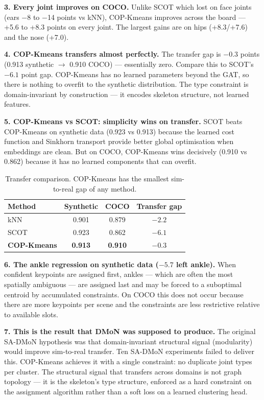 \textbf{3. Every joint improves on COCO.} Unlike SCOT which lost on face joints (ears $-$8 to $-$14 points vs kNN), COP-Kmeans improves across the board --- +5.6 to +8.3 points on every joint. The largest gains are on hips (+8.3/+7.6) and the nose (+7.0).

\textbf{4. COP-Kmeans transfers almost perfectly.} The transfer gap is $-0.3$ points (0.913 synthetic $\to$ 0.910 COCO) --- essentially zero. Compare this to SCOT's $-6.1$ point gap. COP-Kmeans has no learned parameters beyond the GAT, so there is nothing to overfit to the synthetic distribution. The type constraint is domain-invariant by construction --- it encodes skeleton structure, not learned features.

\textbf{5. COP-Kmeans vs SCOT: simplicity wins on transfer.} SCOT beats COP-Kmeans on synthetic data (0.923 vs 0.913) because the learned cost function and Sinkhorn transport provide better global optimisation when embeddings are clean. But on COCO, COP-Kmeans wins decisively (0.910 vs 0.862) because it has no learned components that can overfit.

\begin{table}[H]
\centering
\footnotesize
\begin{tabular}{lccc}
\toprule
Method & Synthetic & COCO & Transfer gap \\
\midrule
kNN & 0.901 & 0.879 & $-2.2$ \\
SCOT & 0.923 & 0.862 & $-6.1$ \\
\textbf{COP-Kmeans} & \textbf{0.913} & \textbf{0.910} & $\mathbf{-0.3}$ \\
\bottomrule
\end{tabular}
\caption{Transfer comparison. COP-Kmeans has the smallest sim-to-real gap of any method.}
\end{table}

\textbf{6. The ankle regression on synthetic data ($-5.7$ left ankle).} When confident keypoints are assigned first, ankles --- which are often the most spatially ambiguous --- are assigned last and may be forced to a suboptimal centroid by accumulated constraints. On COCO this does not occur because there are more keypoints per scene and the constraints are less restrictive relative to available slots.

\textbf{7. This is the result that DMoN was supposed to produce.} The original SA-DMoN hypothesis was that domain-invariant structural signal (modularity) would improve sim-to-real transfer. Ten SA-DMoN experiments failed to deliver this. COP-Kmeans achieves it with a single constraint: no duplicate joint types per cluster. The structural signal that transfers across domains is not graph topology --- it is the skeleton's type structure, enforced as a hard constraint on the assignment algorithm rather than a soft loss on a learned clustering head.


